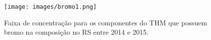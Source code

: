 \begin{figure}[!htb]
\caption{\small Faixa de concentração para os componentes do THM que possuem bromo na composição  no RS entre 2014 e 2015.}
\centering
\texttt{[image: images/bromo1.png]}
\label{fig03}
\end{figure}



























